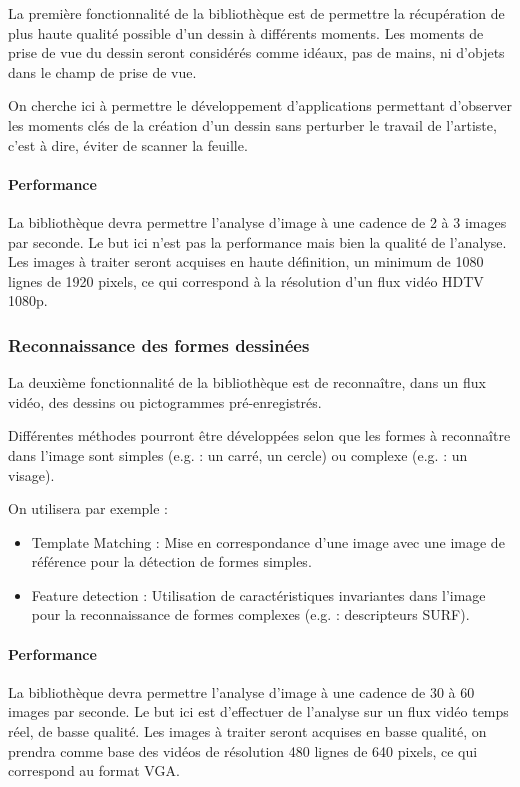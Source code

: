 La première fonctionnalité de la bibliothèque est de permettre la récupération de plus haute qualité possible d’un dessin à différents moments. Les moments de prise de vue du dessin seront considérés comme idéaux, pas de mains, ni d'objets dans le champ de prise de vue.

On cherche ici à permettre le développement d'applications permettant d'observer les moments clés de la création d'un dessin sans perturber le travail de l'artiste, c'est à dire, éviter de scanner la feuille.

\paragraph{Performance\protect\footnotemark[1]\\}
La bibliothèque devra permettre l'analyse d'image à une cadence de 2 à 3 images par seconde. Le but ici n'est pas la performance mais bien la qualité de l'analyse.
Les images à traiter seront acquises en haute définition, un minimum de 1080 lignes de 1920 pixels, ce qui correspond à la résolution d'un flux vidéo HDTV 1080p.


\subsubsection{Reconnaissance des formes dessinées}
La deuxième fonctionnalité de la bibliothèque est de reconnaître, dans un flux vidéo, des dessins ou pictogrammes pré-enregistrés. 

Différentes méthodes pourront être développées selon que les formes à reconnaître dans l'image sont simples (e.g. : un carré, un cercle) ou complexe (e.g. : un visage).

On utilisera par exemple :

\begin{itemize}
\item Template Matching : Mise en correspondance d'une image avec une image de référence pour la détection de formes simples.
\item Feature detection : Utilisation de caractéristiques invariantes dans l'image pour la reconnaissance de formes complexes (e.g. : descripteurs SURF).
\end{itemize}

\paragraph{Performance\protect\footnotemark[1]\\}
La bibliothèque devra permettre l'analyse d'image à une cadence de 30 à 60 images par seconde. Le but ici est d'effectuer de l'analyse sur un flux vidéo temps réel, de basse qualité.
Les images à traiter seront acquises en basse qualité, on prendra comme base des vidéos de résolution 480 lignes de 640 pixels, ce qui correspond au format VGA.

